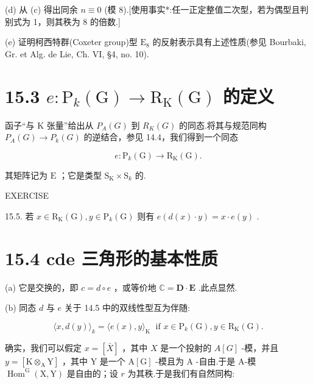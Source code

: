\documentclass[10pt]{article}
\begin{document}
(d) 从 (c) 得出同余 \(n \equiv  0\) (模 8).[使用事实*:任一正定整值二次型，若为偶型且判别式为 1，则其秩为 8 的倍数.]

(e) 证明柯西特群(Coxeter group)型 \({\mathrm{E}}_{8}\) 的反射表示具有上述性质(参见 Bourbaki, Gr. et Alg. de Lie, Ch. VI, §4, no. 10).

\section*{15.3 \(e : {\mathrm{P}}_{k}\left( \mathrm{G}\right)  \rightarrow  {\mathrm{R}}_{\mathrm{K}}\left( \mathrm{G}\right)\) 的定义}

函子“与 \(\mathrm{K}\) 张量”给出从 \({P}_{A}\left( G\right)\) 到 \({R}_{K}\left( G\right)\) 的同态.将其与规范同构 \({P}_{A}\left( G\right)  \rightarrow  {P}_{k}\left( G\right)\) 的逆结合，参见 14.4，我们得到一个同态

\[
e : {\mathrm{P}}_{k}\left( \mathrm{G}\right)  \rightarrow  {\mathrm{R}}_{\mathrm{K}}\left( \mathrm{G}\right) .
\]

其矩阵记为 \(\mathrm{E}\) ；它是类型 \({\mathrm{S}}_{\mathrm{K}} \times  {\mathrm{S}}_{k}\) 的.

EXERCISE

15.5. 若 \(x \in  {\mathrm{R}}_{\mathrm{K}}\left( \mathrm{G}\right) ,y \in  {\mathrm{P}}_{k}\left( \mathrm{G}\right)\) 则有 \(e\left( {d\left( x\right)  \cdot  y}\right)  = x \cdot  e\left( y\right)\) .

\section*{15.4 cde 三角形的基本性质}

(a) 它是交换的，即 \(c = d \circ  e\) ，或等价地 \(\mathbb{C} = \mathbf{D} \cdot  \mathbf{E}\) .此点显然.

(b) 同态 \(d\) 与 \(e\) 关于 14.5 中的双线性型互为伴随:

\[
\langle x,d\left( y\right) {\rangle }_{k} = \langle e\left( x\right) ,y{\rangle }_{\mathrm{K}}\;\text{ if }x \in  {\mathrm{P}}_{k}\left( \mathrm{G}\right) ,y \in  {\mathrm{R}}_{\mathrm{K}}\left( \mathrm{G}\right) .
\]

确实，我们可以假定 \(x = \left\lbrack  \bar{X}\right\rbrack\) ，其中 \(X\) 是一个投射的 \(A\left\lbrack  G\right\rbrack\) -模，并且 \(y = \left\lbrack  {\mathrm{K}{ \otimes  }_{\mathrm{A}}\mathrm{Y}}\right\rbrack\) ，其中 \(\mathrm{Y}\) 是一个 \(\mathrm{A}\left\lbrack  \mathrm{G}\right\rbrack\) -模且为 \(\mathrm{A}\) -自由.于是 A-模 \({\operatorname{Hom}}^{\mathrm{G}}\left( {\mathrm{X},\mathrm{Y}}\right)\) 是自由的；设 \(r\) 为其秩.于是我们有自然同构:
\end{document}
